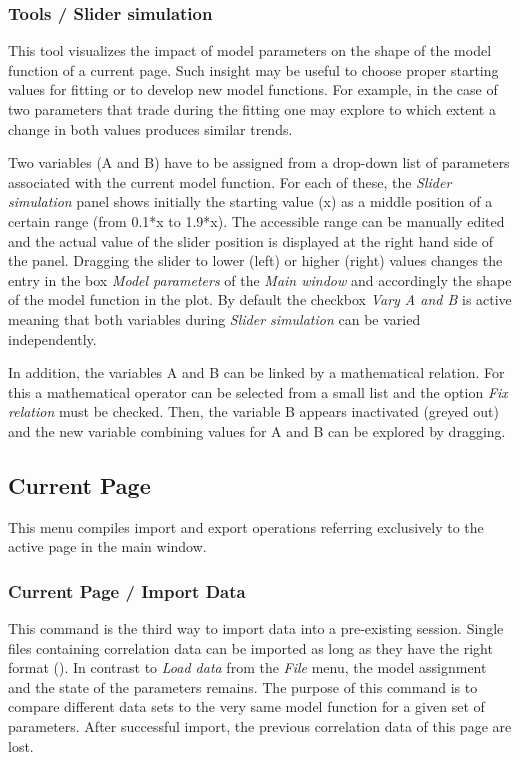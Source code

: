 \subsubsection{Tools / Slider simulation}
\label{sec:menub.tools.slide}
This tool visualizes the impact of model parameters on the shape of the model function of a current page. Such insight may be useful to choose proper starting values for fitting or to develop new model functions. For example, in the case of two parameters that trade during the fitting one may explore to which extent a change in both values produces similar trends.

Two variables (A and B) have to be assigned from a drop-down list of parameters associated with the current model function. For each of these, the \textit{Slider simulation} panel shows initially the starting value (x) as a middle position of a certain range (from 0.1*x to 1.9*x). The accessible range can be manually edited and the actual value of the slider position is displayed at the right hand side of the panel. Dragging the slider to lower (left) or higher (right) values changes the entry in the box \textit{Model parameters} of the \textit{Main window} and accordingly the shape of the model function in the plot. By default the checkbox \textit{Vary A and B}\textit{ }is active meaning that both variables during \textit{Slider simulation} can be varied independently. 

In addition, the variables A and B can be linked by a mathematical relation. For this a mathematical operator can be selected from a small list and the option \textit{Fix relation} must be checked. Then, the variable B appears inactivated (greyed out) and the new variable combining values for A and B can be explored by dragging.

\subsection{Current Page}
\label{sec:menub.curre}
This menu compiles import and export operations referring exclusively to the active page in the main window. 

\subsubsection{Current Page / Import Data}
\label{sec:menub.curre.impor}
This command is the third way to import data into a pre-existing session. Single files containing correlation data can be imported as long as they have the right format (). In contrast to \textit{Load data} from the \textit{File} menu, the model assignment and the state of the parameters remains. The purpose of this command is to compare different data sets to the very same model function for a given set of parameters. After successful import, the previous correlation data of this page are lost.

